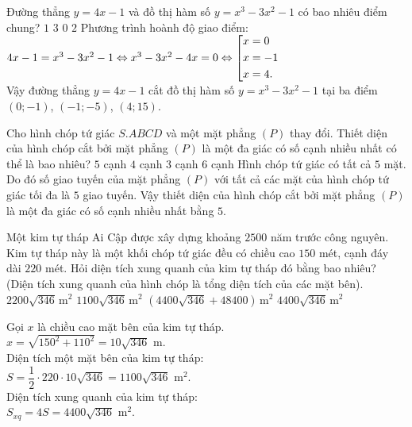 \begin{ex}%
 Đường thẳng $y = 4x - 1$ và đồ thị hàm số $y = x^3 - 3x^2 - 1$ có bao nhiêu điểm chung?
 \choice
  {$1$}
  {\True $3$}
  {$0$}
  {$2$}
 \loigiai
  {
  Phương trình hoành độ giao điểm: $4x - 1 = x^3 - 3x^2 - 1 \Leftrightarrow x^3 - 3x^2 - 4x = 0 \Leftrightarrow \left[\begin{aligned}& x = 0 \\& x = -1 \\& x = 4.\end{aligned}\right.$\\
  Vậy đường thẳng $y = 4x - 1$ cắt đồ thị hàm số $y = x^3 - 3x^2 - 1$ tại ba điểm $(0;-1)$, $(-1;-5)$, $(4;15)$.
  }
\end{ex}


\begin{ex}%
 Cho hình chóp tứ giác $S.ABCD$ và một mặt phẳng $(P)$ thay đổi. Thiết diện của hình chóp cắt bởi mặt phẳng $(P)$ là một đa giác có số cạnh nhiều nhất có thể là bao nhiêu?
 \choice
  {\True $5$ cạnh}
  {$4$ cạnh}
  {$3$ cạnh}
  {$6$ cạnh}
 \loigiai
  {
  Hình chóp tứ giác có tất cả $5$ mặt. Do đó số giao tuyến của mặt phẳng $(P)$ với tất cả các mặt của hình chóp tứ giác tối đa là $5$ giao tuyến. Vậy thiết diện của hình chóp cắt bởi mặt phẳng $(P)$ là một đa giác có số cạnh nhiều nhất bằng $5$.
  }
\end{ex}


\begin{ex}%
 Một kim tự tháp Ai Cập được xây dựng khoảng $2500$ năm trước công nguyên. Kim tự tháp này là một khối chóp tứ giác đều có chiều cao $150$ mét, cạnh đáy dài $220$ mét. Hỏi diện tích xung quanh của kim tự tháp đó bằng bao nhiêu? (Diện tích xung quanh của hình chóp là tổng diện tích của các mặt bên).
 \choice
  {$2200\sqrt{346}\, \mathrm{m}^2$}
  {$1100\sqrt{346}\, \mathrm{m}^2$}
  {$\left(4400\sqrt{346} + 48400\right) \, \mathrm{m}^2$}
  {\True $4400\sqrt{346}\, \mathrm{m}^2$}
 \loigiai
  {
  \immini
  {
  Gọi $x$ là chiều cao mặt bên của kim tự tháp.\\
  $x = \sqrt{150^2 + 110^2} = 10\sqrt{346}$ m.\\
  Diện tích một mặt bên của kim tự tháp:\\
  $S = \dfrac{1}{2} \cdot 220 \cdot 10\sqrt{346} = 1100\sqrt{346} \text{ m}^2$.\\
  Diện tích xung quanh của kim tự tháp:\\
  $S_{xq} = 4S = 4400\sqrt{346} \text{ m}^2$.
  }
  {
  }
  }
\end{ex}


